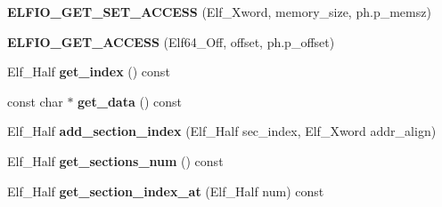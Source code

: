 \begin{DoxyCompactItemize}
\item 
{\bfseries E\+L\+F\+I\+O\+\_\+\+G\+E\+T\+\_\+\+S\+E\+T\+\_\+\+A\+C\+C\+E\+SS} (Elf\+\_\+\+Xword, memory\+\_\+size, ph.\+p\+\_\+memsz)\hypertarget{class_e_l_f_i_o_1_1segment__impl_a6ef3ac1705af9c13964168befe7b9215}{}\label{class_e_l_f_i_o_1_1segment__impl_a6ef3ac1705af9c13964168befe7b9215}

\item 
{\bfseries E\+L\+F\+I\+O\+\_\+\+G\+E\+T\+\_\+\+A\+C\+C\+E\+SS} (Elf64\+\_\+\+Off, offset, ph.\+p\+\_\+offset)\hypertarget{class_e_l_f_i_o_1_1segment__impl_a683a090191910859c972573717645313}{}\label{class_e_l_f_i_o_1_1segment__impl_a683a090191910859c972573717645313}

\item 
Elf\+\_\+\+Half {\bfseries get\+\_\+index} () const \hypertarget{class_e_l_f_i_o_1_1segment__impl_a099f293f2e9d9a8f8ad48993e8a6dace}{}\label{class_e_l_f_i_o_1_1segment__impl_a099f293f2e9d9a8f8ad48993e8a6dace}

\item 
const char $\ast$ {\bfseries get\+\_\+data} () const \hypertarget{class_e_l_f_i_o_1_1segment__impl_a035a3abc777168546bdeba8669836078}{}\label{class_e_l_f_i_o_1_1segment__impl_a035a3abc777168546bdeba8669836078}

\item 
Elf\+\_\+\+Half {\bfseries add\+\_\+section\+\_\+index} (Elf\+\_\+\+Half sec\+\_\+index, Elf\+\_\+\+Xword addr\+\_\+align)\hypertarget{class_e_l_f_i_o_1_1segment__impl_afb94d1145f859cf4e597d1ace7988eba}{}\label{class_e_l_f_i_o_1_1segment__impl_afb94d1145f859cf4e597d1ace7988eba}

\item 
Elf\+\_\+\+Half {\bfseries get\+\_\+sections\+\_\+num} () const \hypertarget{class_e_l_f_i_o_1_1segment__impl_acefd1c6b5299ea34e25679b1176aa5f2}{}\label{class_e_l_f_i_o_1_1segment__impl_acefd1c6b5299ea34e25679b1176aa5f2}

\item 
Elf\+\_\+\+Half {\bfseries get\+\_\+section\+\_\+index\+\_\+at} (Elf\+\_\+\+Half num) const \hypertarget{class_e_l_f_i_o_1_1segment__impl_a7922fd71d91577a75a5e49066b0cec9c}{}\label{class_e_l_f_i_o_1_1segment__impl_a7922fd71d91577a75a5e49066b0cec9c}

\end{DoxyCompactItemize}
